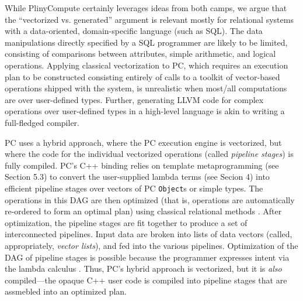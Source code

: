 While PlinyCompute certainly leverages ideas from both camps, we argue that the ``vectorized vs. generated'' argument is relevant mostly for 
relational systems with a data-oriented, domain-specific language (such as SQL).  
The data manipulations directly specified by a SQL programmer are likely to be limited, 
consisting of comparisons between attributes, simple arithmetic, and logical operations.
Applying classical vectorization to PC,
which requires an execution plan to be constructed consisting entirely of calls to a toolkit of
vector-based operations shipped with the system, is
unrealistic when most/all computations are over user-defined types.  
Further, generating LLVM code for complex operations over user-defined types 
in a high-level language 
is akin to writing a full-fledged compiler. 

PC uses a hybrid approach, where the PC execution engine is vectorized, but where the code for the individual vectorized operations (called \emph{pipeline stages})
is fully compiled.  PC's C++ binding relies on template metaprogramming (see Section 5.3)
to convert the user-supplied lambda terms 
(see Secion 4) into efficient pipeline stages over vectors of PC \texttt{Object}s or simple types.
The operations in this DAG are then
optimized (that is, operations are automatically
re-ordered to form an optimal plan) using classical relational
methods \cite{chaudhuri1998overview, graefe1995cascades, jarke1984query}. After optimization, the pipeline stages are fit together to produce a set of interconnected pipelines.  Input data are broken into lists of 
data vectors (called, appropriately, \emph{vector lists}), and fed into the various pipelines.
Optimization of the DAG of pipeline stages
is possible because the programmer expresses intent via the lambda calculus \cite{barendregt1984lambda, moggi1989computational}.
Thus, PC's hybrid approach is vectorized, 
but it is \emph{also} compiled---the opaque C++ user code is compiled into pipeline stages that are 
assmebled into an optimized plan.


